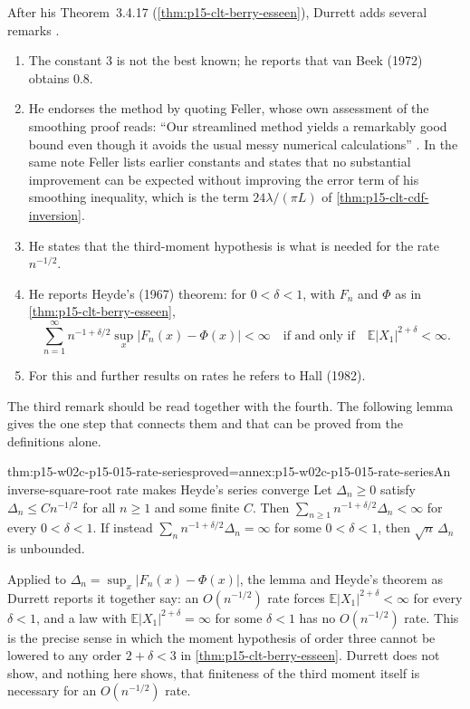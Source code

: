 After his Theorem~3.4.17 (\cref{thm:p15-clt-berry-esseen}), Durrett adds
several remarks \cite[p.~157]{DurrettPTEAuthor2019}.
\begin{enumerate}
\item The constant \(3\) is not the best known; he reports that van Beek
 (1972) obtains \(0.8\).
\item He endorses the method by quoting Feller, whose own assessment of
 the smoothing proof reads: ``Our streamlined method yields a remarkably
 good bound even though it avoids the usual messy numerical
 calculations'' \cite[ch.~XVI, sec.~5, p.~542, n.~7]{Feller1971ProbabilityII}.
 In the same note Feller lists earlier constants and states that no
 substantial improvement can be expected without improving the error
 term of his smoothing inequality, which is the term
 \(24\lambda/(\pi L)\) of \cref{thm:p15-clt-cdf-inversion}.
\item He states that the third-moment hypothesis is what is needed for
 the rate \(n^{-1/2}\).
\item He reports Heyde's (1967) theorem: for \(0<\delta<1\), with
 \(F_n\) and \(\Phi\) as in \cref{thm:p15-clt-berry-esseen},
 \[
  \sum_{n=1}^\infty n^{-1+\delta/2}\sup_x|F_n(x)-\Phi(x)|<\infty
  \quad\text{if and only if}\quad\mathbb E|X_1|^{2+\delta}<\infty .
 \]
\item For this and further results on rates he refers to Hall (1982).
\end{enumerate}
The third remark should be read together with the fourth. The following
lemma gives the one step that connects them and that can be proved
from the definitions alone.

\begin{hblemma}{thm:p15-w02c-p15-015-rate-series}{proved=annex:p15-w02c-p15-015-rate-series}{An inverse-square-root rate makes Heyde's series converge}
Let \(\Delta_n\geq0\) satisfy \(\Delta_n\leq Cn^{-1/2}\) for all
\(n\geq1\) and some finite \(C\). Then
\(\sum_{n\geq1}n^{-1+\delta/2}\Delta_n<\infty\) for every
\(0<\delta<1\). If instead \(\sum_nn^{-1+\delta/2}\Delta_n=\infty\) for
some \(0<\delta<1\), then \(\sqrt n\,\Delta_n\) is unbounded.
\end{hblemma}

Applied to \(\Delta_n=\sup_x|F_n(x)-\Phi(x)|\), the lemma and Heyde's
theorem as Durrett reports it together say: an \(O(n^{-1/2})\) rate
forces \(\mathbb E|X_1|^{2+\delta}<\infty\) for every \(\delta<1\), and
a law with \(\mathbb E|X_1|^{2+\delta}=\infty\) for some \(\delta<1\)
has no \(O(n^{-1/2})\) rate. This is the precise sense in which the
moment hypothesis of order three cannot be lowered to any order
\(2+\delta<3\) in \cref{thm:p15-clt-berry-esseen}. Durrett does not
show, and nothing here shows, that finiteness of the third moment itself
is necessary for an \(O(n^{-1/2})\) rate.

